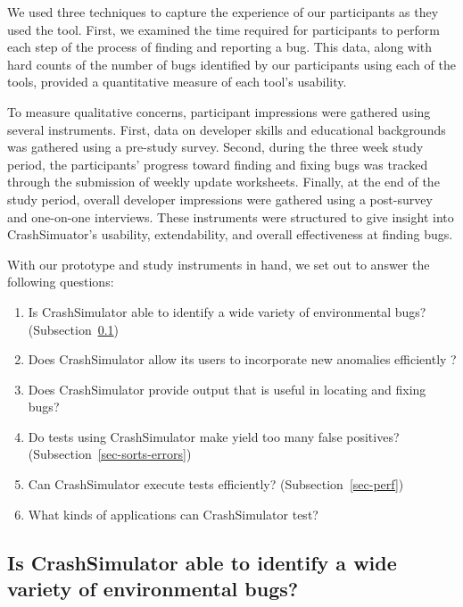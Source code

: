 We used three techniques to capture the experience of our participants as
they used the tool.  First, we examined the time required for participants
to perform each step of the process of finding and reporting a bug.
This data, along with hard counts of the number of bugs identified by our
participants using each of the tools, provided a quantitative measure of
each tool's usability.

To measure qualitative concerns,
participant impressions were gathered using
several instruments.  First, data on developer skills and educational
backgrounds was gathered using a pre-study survey.
Second, during the three week
study period, the participants' progress toward finding and fixing bugs was
tracked through the submission of weekly update worksheets.  Finally, at
the end of the study period, overall developer impressions were gathered
using a post-survey and one-on-one interviews.  These instruments were
structured to give insight into CrashSimuator's usability, extendability, and
overall effectiveness at finding bugs.

With our prototype and study instruments in hand, we
set out to answer the following questions:

\begin{enumerate}

\item{Is CrashSimulator able to identify a wide variety of environmental
    bugs?
(Subsection~\ref{sec-env-bugs})}

\item{Does CrashSimulator allow its users to incorporate new anomalies
      efficiently ?}

\item Does CrashSimulator provide output that is useful in locating and
fixing bugs?

\item{Do tests using CrashSimulator make yield too many false positives?
      (Subsection~\ref{sec-sorts-errors})}

\item{Can CrashSimulator
      execute tests efficiently? (Subsection~\ref{sec-perf})}

\item{What kinds of applications can CrashSimulator test?}

\end{enumerate}

\subsection{Is CrashSimulator able to identify a wide variety of
environmental bugs?}
\label{sec-env-bugs}

